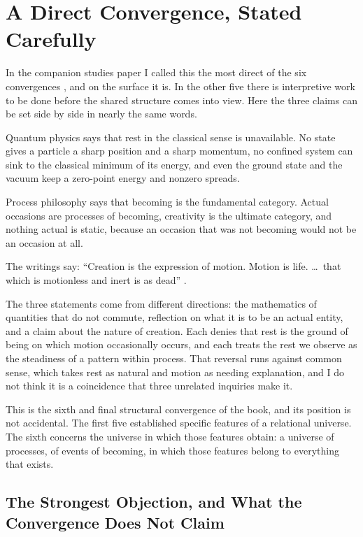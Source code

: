 \section{A Direct Convergence, Stated Carefully}
\label{sec:ch12-convergence}

In the companion \bahai studies paper I called this the most direct of the six convergences \citep{AdamsMahabbat}, and on the surface it is. In the other five there is interpretive work to be done before the shared structure comes into view. Here the three claims can be set side by side in nearly the same words.

Quantum physics says that rest in the classical sense is unavailable. No state gives a particle a sharp position and a sharp momentum, no confined system can sink to the classical minimum of its energy, and even the ground state and the vacuum keep a zero-point energy and nonzero spreads.

Process philosophy says that becoming is the fundamental category. Actual occasions are processes of becoming, creativity is the ultimate category, and nothing actual is static, because an occasion that was not becoming would not be an occasion at all.

The \bahai writings say: ``Creation is the expression of motion. Motion is life. \ldots\ that which is motionless and inert is as dead'' \citep[Talk 52]{PUP}.

The three statements come from different directions: the mathematics of quantities that do not commute, reflection on what it is to be an actual entity, and a claim about the nature of creation. Each denies that rest is the ground of being on which motion occasionally occurs, and each treats the rest we observe as the steadiness of a pattern within process. That reversal runs against common sense, which takes rest as natural and motion as needing explanation, and I do not think it is a coincidence that three unrelated inquiries make it.

This is the sixth and final structural convergence of the book, and its position is not accidental. The first five established specific features of a relational universe. The sixth concerns the universe in which those features obtain: a universe of processes, of events of becoming, in which those features belong to everything that exists.

\subsection*{The Strongest Objection, and What the Convergence Does Not Claim}

